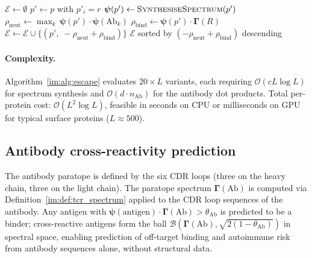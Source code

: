 \begin{algorithm}
\caption{Immune escape variant enumeration}
\label{im:alg:escape}
\begin{algorithmic}[1]
\State $\mathcal{E} \gets \emptyset$
  \State $p' \gets p$ with $p'_i = r$
    \hfill{}
  \State $\bm{\psi}(p') \gets \textsc{SynthesiseSpectrum}(p')$
    \hfill{}
  \State $\rho_{\mathrm{neut}} \gets \max_k\,
    \bm{\psi}(p')\cdot\bm{\psi}(\mathrm{Ab}_k)$
  \State $\rho_{\mathrm{bind}} \gets \bm{\psi}(p')\cdot\bm{\Gamma}(R)$
    \State $\mathcal{E} \gets \mathcal{E} \cup
      \{(p',\; -\rho_{\mathrm{neut}} + \rho_{\mathrm{bind}})\}$
  \EndIf
\EndFor
\State \Return $\mathcal{E}$ sorted by
  $(-\rho_{\mathrm{neut}} + \rho_{\mathrm{bind}})$ descending
\end{algorithmic}
\end{algorithm}

\paragraph{Complexity.}
Algorithm~\ref{im:alg:escape} evaluates $20 \times L$ variants, each requiring
$\mathcal{O}(cL\log L)$ for spectrum synthesis and $\mathcal{O}(d\cdot
n_{\mathrm{Ab}})$ for the antibody dot products. Total per-protein cost:
$\mathcal{O}(L^2\log L)$, feasible in seconds on CPU or milliseconds on GPU
for typical surface proteins ($L \approx 500$).

\subsection{Antibody cross-reactivity prediction}
\label{im:sec:ab_cross_reactivity}

The antibody paratope is defined by the six CDR loops (three on the heavy
chain, three on the light chain). The paratope spectrum
$\bm{\Gamma}(\mathrm{Ab})$ is computed via Definition~\ref{im:def:tcr_spectrum}
applied to the CDR loop sequences of the antibody. Any antigen with
$\bm{\psi}(\mathrm{antigen})\cdot\bm{\Gamma}(\mathrm{Ab}) > \theta_{\mathrm{Ab}}$
is predicted to be a binder; cross-reactive antigens form the ball
$\mathcal{B}(\bm{\Gamma}(\mathrm{Ab}), \sqrt{2(1-\theta_{\mathrm{Ab}})})$
in spectral space, enabling prediction of off-target binding and autoimmune
risk from antibody sequences alone, without structural data.

